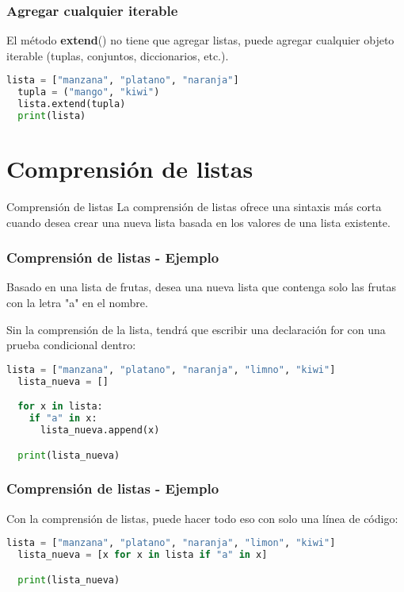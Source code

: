 \begin{frame}[fragile]
  \frametitle{Agregar cualquier iterable}

  El método \textbf{extend}() no tiene que agregar listas,
  puede agregar cualquier objeto iterable
  (tuplas, conjuntos, diccionarios, etc.).

  \vspace{\baselineskip}
  \begin{lstlisting}[language=Python]
  lista = ["manzana", "platano", "naranja"]
  tupla = ("mango", "kiwi")
  lista.extend(tupla)
  print(lista)
  \end{lstlisting}
\end{frame}

\section{Comprensión de listas}

\begin{frame}[c]{Comprensión de listas}
  La comprensión de listas ofrece una sintaxis más corta cuando
  desea crear una nueva lista basada en los valores de una lista
  existente.
\end{frame}

\begin{frame}[fragile]
  \frametitle{Comprensión de listas - Ejemplo}

  Basado en una lista de frutas, desea una nueva lista que
  contenga solo las frutas con la letra "a" en el nombre.

  \vspace{\baselineskip}
  Sin la comprensión de la lista, tendrá que escribir una declaración
  \textcolor{codeKeyword}{for} con una prueba condicional dentro: 

  \vspace{\baselineskip}
  \begin{lstlisting}[language=Python]
  lista = ["manzana", "platano", "naranja", "limno", "kiwi"]
  lista_nueva = []

  for x in lista:
    if "a" in x:
      lista_nueva.append(x)

  print(lista_nueva)
  \end{lstlisting}
\end{frame}

\begin{frame}[fragile]
  \frametitle{Comprensión de listas - Ejemplo}

  Con la comprensión de listas, puede hacer todo eso con
  solo una línea de código:

  \vspace{\baselineskip}
  \begin{lstlisting}[language=Python]
  lista = ["manzana", "platano", "naranja", "limon", "kiwi"]
  lista_nueva = [x for x in lista if "a" in x]

  print(lista_nueva)
  \end{lstlisting}
\end{frame}
